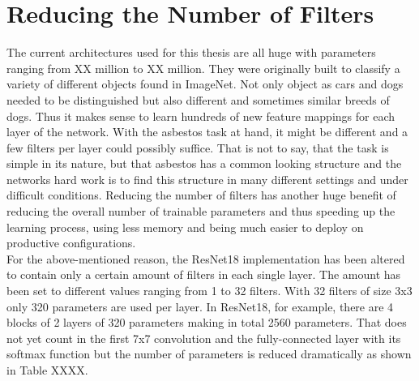 \section{Reducing the Number of Filters}

The current architectures used for this thesis are all huge with parameters ranging from XX million to XX million. They were originally built to classify a variety of different objects found in ImageNet. Not only object as cars and dogs needed to be distinguished but also different and sometimes similar breeds of dogs. Thus it makes sense to learn hundreds of new feature mappings for each layer of the network. With the asbestos task at hand, it might be different and a few filters per layer could possibly suffice. That is not to say, that the task is simple in its nature, but that asbestos has a common looking structure and the networks hard work is to find this structure in many different settings and under difficult conditions. Reducing the number of filters has another huge benefit of reducing the overall number of trainable parameters and thus speeding up the learning process, using less memory and being much easier to deploy on productive configurations.\\

For the above-mentioned reason, the ResNet18 implementation has been altered to contain only a certain amount of filters in each single layer. The amount has been set to different values ranging from 1 to 32 filters. With 32 filters of size 3x3 only 320 parameters are used per layer. In ResNet18, for example, there are 4 blocks of 2 layers of 320 parameters making in total 2560 parameters. That does not yet count in the first 7x7 convolution and the fully-connected layer with its softmax function but the number of parameters is reduced dramatically as shown in Table XXXX.


\begin{table}[h] \centering
{}
\caption{Resnet18 with different number of filters on the FINAL dataset. The number of filters present in paranthesis is the number of filters used per layer.}
\label{tbl:resnet18-sixteen}
\end{table}

